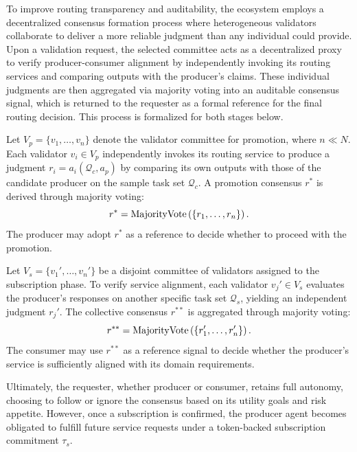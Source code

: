 To improve routing transparency and auditability, the ecosystem employs a decentralized consensus formation process where heterogeneous validators collaborate to deliver a more reliable judgment than any individual could provide. Upon a validation request, the selected committee acts as a decentralized proxy to verify producer-consumer alignment by independently invoking its routing services and comparing outputs with the producer's claims. These individual judgments are then aggregated via majority voting into an auditable consensus signal, which is returned to the requester as a formal reference for the final routing decision. This process is formalized for both stages below.

\begin{definition}\label{def:promo_consensus}
Let $V_p = \{v_1, \ldots, v_n\}$ denote the validator committee for promotion, where $n \ll N$. Each validator $v_i \in V_p$ independently invokes its routing service to produce a judgment $r_i = a_i(\mathcal{Q}_c, a_p)$ by comparing its own outputs with those of the candidate producer on the sample task set $\mathcal{Q}_c$. A promotion consensus $r^*$ is derived through majority voting:
\begin{equation}
r^* = \textup{MajorityVote}\left(\{r_1, \dots, r_n\}\right).
\end{equation}
The producer may adopt $r^*$ as a reference to decide whether to proceed with the promotion.
\end{definition}

\begin{definition}\label{def:sub_consensus}
Let $V_s = \{v_1', \ldots, v_n'\}$ be a disjoint committee of validators assigned to the subscription phase. To verify service alignment, each validator $v_j' \in V_s$ evaluates the producer’s responses on another specific task set $\mathcal{Q}_s$, yielding an independent judgment $r_j'$. The collective consensus $r^{**}$ is aggregated through majority voting:
\begin{equation}
r^{**} = \textup{MajorityVote}\left(\{r_1', \ldots, r_n'\}\right).
\end{equation}
The consumer may use $r^{**}$ as a reference signal to decide whether the producer's service is sufficiently aligned with its domain requirements.
\end{definition}

Ultimately, the requester, whether producer or consumer, retains full autonomy, choosing to follow or ignore the consensus based on its utility goals and risk appetite. However, once a subscription is confirmed, the producer agent becomes obligated to fulfill future service requests under a token-backed subscription commitment $\tau_s$.

